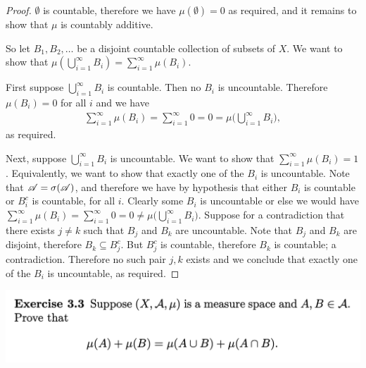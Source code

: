 \begin{proof}
  $\emptyset$ is countable, therefore we have $\mu(\emptyset) = 0$ as required, and it remains to show
  that $\mu$ is countably additive.

  So let $B_1, B_2, \dots$ be a disjoint countable collection of subsets of $X$. We want to show
  that $\mu(\bigcup_{i=1}^\infty B_i) = \sum_{i=1}^\infty \mu(B_i)$.


  First suppose $\bigcup_{i=1}^\infty B_i$ is countable. Then no $B_i$ is uncountable. Therefore $\mu(B_i) = 0$
  for all $i$ and we have
  \begin{align*}
    \sum_{i=1}^\infty \mu(B_i) = \sum_{i=1}^\infty 0 = 0 = \mu\big(\bigcup_{i=1}^\infty B_i\big),
  \end{align*}
  as required.

  Next, suppose $\bigcup_{i=1}^\infty B_i$ is uncountable. We want to show
  that $\sum_{i=1}^\infty \mu(B_i) = 1$. Equivalently, we want to show that exactly one of the $B_i$ is
  uncountable. Note that $\mathscr A = \sigma(\mathscr A)$, and therefore we have by hypothesis that either $B_i$ is
  countable or $B_i^c$ is countable, for all $i$. Clearly some $B_i$ is uncountable or else we would
  have $\sum_{i=1}^\infty \mu(B_i) = \sum_{i=1}^\infty 0 = 0 \neq \mu\big(\bigcup_{i=1}^\infty B_i\big)$.
  Suppose for a contradiction that there exists $j \neq k$ such that $B_j$ and $B_k$ are uncountable. Note
  that $B_j$ and $B_k$ are disjoint, therefore $B_k \subseteq B_j^c$. But $B_j^c$ is countable, therefore $B_k$
  is countable; a contradiction. Therefore no such pair $j, k$ exists and we conclude that exactly one of
  the $B_i$ is uncountable, as required.
\end{proof}
\newpage
\begin{mdframed}
\includegraphics[width=400pt]{img/analysis--berkeley-202a-hw-2389.png}
\end{mdframed}

